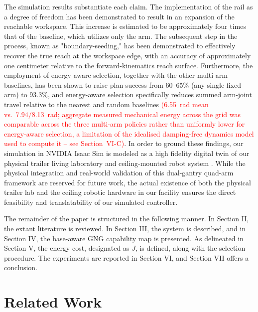 \documentclass[conference]{IEEEtran}
\begin{document}
The simulation results substantiate each claim. The implementation of the rail as 
a degree of freedom has been demonstrated to result in an expansion of the reachable 
workspace. This increase is estimated to be approximately four times that of the baseline, 
which utilizes only the arm. The subsequent step in the process, known as "boundary-seeding," 
has been demonstrated to effectively recover the true reach at the workspace edge, 
with an accuracy of approximately one centimeter relative to the forward-kinematics 
reach surface. Furthermore, the employment of energy-aware
selection, together with the other multi-arm baselines, has been shown to raise
plan success from 60--65\% (any single fixed arm) to 93.3\%, and energy-aware
selection specifically reduces summed arm-joint travel relative to the nearest
and random baselines \textcolor{red}{(6.55~rad mean vs.\ 7.94/8.13~rad; aggregate
measured mechanical energy across the grid was comparable across the three
multi-arm policies rather than uniformly lower for energy-aware selection, a
limitation of the idealised damping-free dynamics model used to compute it --
see Section~VI-C)}. In order to ground these findings, our simulation in NVIDIA Isaac Sim \cite{IsaacSim2026}
is modeled as a high fidelity digital twin of our physical trailer living laboratory 
and ceiling-mounted robot system \cite{Kubota2022}. 
While the physical integration and real-world validation of this dual-gantry quad-arm 
framework are reserved for future work, the actual existence of both the physical 
trailer lab and the ceiling robotic hardware in our facility ensures the direct 
feasibility and translatability of our simulated controller.

The remainder of the paper is structured in the following manner. In Section II, 
the extant literature is reviewed. In Section III, the system is described, and 
in Section IV, the base-aware GNG capability map is presented. As delineated in Section V, 
the energy cost, designated as $J$, is defined, along with the selection procedure. 
The experiments are reported in Section VI, and Section VII offers a conclusion.

\section{Related Work}
\end{document}
